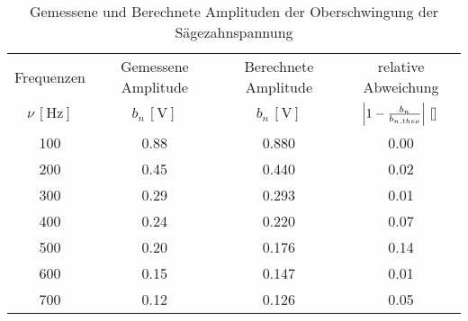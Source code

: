\begin{table}[!h]
	\centering
	\begin{tabular}{|c|c|c|c|}
		\hline
		Frequenzen & Gemessene Amplitude & Berechnete Amplitude & relative Abweichung\\
		$\nu\,[\si{\hertz}]$ & $b_{n}\,[\si{\volt}]$ & $b_{n}\,[\si{\volt}]$ & $\envert{1 - \tfrac{b_{n}}{b_{n,theo}}}\,[\si{}]$\\\hline\hline
		\num{100}  & \num{0.88}  & \num{0.880}  & \num{0.00} \\
		\num{200}  & \num{0.45}  & \num{0.440}  & \num{0.02} \\
		\num{300}  & \num{0.29}  & \num{0.293}  & \num{0.01} \\
		\num{400}  & \num{0.24}  & \num{0.220}  & \num{0.07} \\
		\num{500}  & \num{0.20}  & \num{0.176}  & \num{0.14} \\
		\num{600}  & \num{0.15}  & \num{0.147}  & \num{0.01} \\
		\num{700}  & \num{0.12}  & \num{0.126}  & \num{0.05} \\
		\hline
	\end{tabular}
	\caption{Gemessene und Berechnete Amplituden der Oberschwingung der Sägezahnspannung \label{tab:Analyse3}}
\end{table}